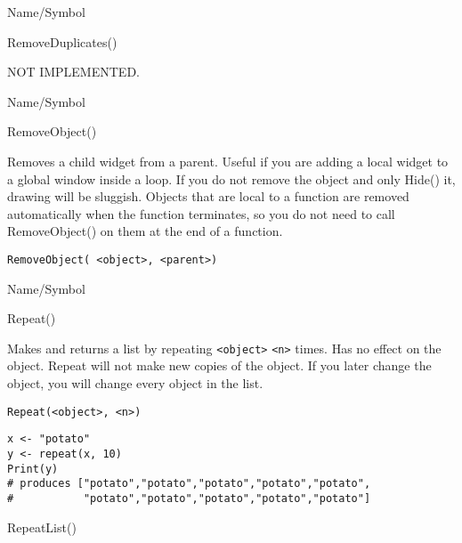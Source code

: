 \rl


\begin{desc}{Name/Symbol}
\item[Name/Symbol]	RemoveDuplicates()

\item[Description]	NOT IMPLEMENTED.

\item[Usage]		

\item[Example]	

\item[See Also]	 
\end{desc}

\rl


\begin{desc}{Name/Symbol}
\item[Name/Symbol]	RemoveObject()

\item[Description]  	Removes a child widget from a parent.  Useful if you are 
		adding a local widget to a global window inside a loop.  If 
		you do not remove the object and only Hide() it, drawing will 
	be sluggish.  Objects that are local to a function are removed 
	automatically when the function terminates, so you do not need 
	to call RemoveObject() on them at the end of a function.

\item[Usage]
\begin{verbatim}
RemoveObject( <object>, <parent>)
\end{verbatim}

\item[Example]	

\item[See Also]	
\end{desc}

\rl


\begin{desc}{Name/Symbol}
\item[Name/Symbol] 	Repeat()

\item[Description] 	Makes and returns a list by repeating \verb+<object>+ \verb+<n>+ times. 
		Has no effect on the object. Repeat will not make new copies 
		of the object. If you later change the object, 
		you will change every object in the list.

\item[Usage]       	
\begin{verbatim}
Repeat(<object>, <n>)
\end{verbatim}
	    	
\item[Example]     	
\begin{verbatim}
x <- "potato"
y <- repeat(x, 10)
Print(y)
# produces ["potato","potato","potato","potato","potato", 
#           "potato","potato","potato","potato","potato"]
\end{verbatim}
	     	     
\item[See Also]    	RepeatList()
\end{desc}


